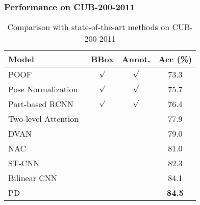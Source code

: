 \documentclass[journal]{IEEEtran}
\begin{document}
\subsubsection{Performance on CUB-200-2011}
\begin{table}[!t]
  \centering
  \caption{Comparison with state-of-the-art methods on CUB-200-2011}
  \vspace{-0.1in}
  \label{tab:comparison_cub_2}
  \begin{tabular}{lccc}
    \hline\hline
    Model                & BBox & Annot. & Acc (\%)\\
    \hline
    POOF~\cite{poof}     & $\surd$   & $\surd$   & 73.3\\
    Pose Normalization~\cite{pose_normalized}  & $\surd$   & $\surd$   & 75.7\\
    Part-based RCNN~\cite{part-based-rcnn}          & $\surd$   & $\surd$   & 76.4\\
    Two-level Attention~\cite{two_level_attention}& & & 77.9\\
    DVAN       &           &           & 79.0\\
    NAC~\cite{nac} & & & 81.0\\
    ST-CNN~\cite{Jaderberg:2015vo} & & & 82.3\\
    Bilinear CNN~\cite{bilinear} & & & 84.1\\
    PD~\cite{Zhang_2016_CVPR} & & &\textbf{84.5}\\
    \hline\hline
  \end{tabular}
  \vspace{-0.2in}
\end{table}
\end{document}
